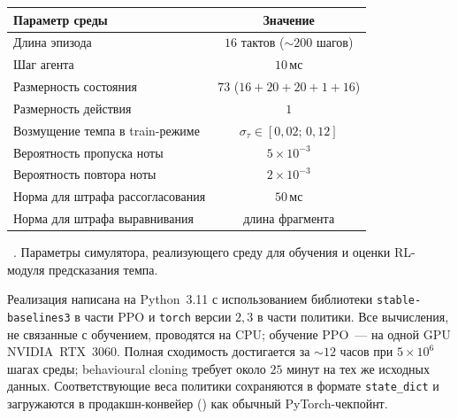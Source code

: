 \par\addvspace{2pt}
{\centering
{}%
\footnotesize
\begin{tabular}{@{}lc@{}}
  \toprule
  Параметр среды                           & Значение \\
  \midrule
  Длина эпизода                            & $16$ тактов ($\sim 200$ шагов) \\
  Шаг агента                               & $10$\,мс \\
  Размерность состояния                    & $73$ ($16+20+20+1+16$) \\
  Размерность действия                     & $1$ \\
  Возмущение темпа в train-режиме          & $\sigma_\tau\in[0{,}02;\,0{,}12]$ \\
  Вероятность пропуска ноты                & $5\!\times\!10^{-3}$ \\
  Вероятность повтора ноты                 & $2\!\times\!10^{-3}$ \\
  Норма для штрафа рассогласования         & $50$\,мс \\
  Норма для штрафа выравнивания            & длина фрагмента \\
  \bottomrule
\end{tabular}\par
\vspace{2pt}
\tablename~\thetable. Параметры симулятора, реализующего среду
для обучения и оценки RL-модуля предсказания темпа.\par}
\addvspace{4pt}

Реализация написана на Python~3.11 с использованием библиотеки
\texttt{stable-baselines3} в части PPO и \texttt{torch} версии $2{,}3$
в части политики. Все вычисления, не связанные с обучением, проводятся
на CPU; обучение PPO~--- на одной GPU NVIDIA~RTX~3060. Полная сходимость
достигается за $\sim 12$ часов при $5\!\times\!10^{6}$ шагах среды;
behavioural cloning требует около $25$ минут на тех же исходных
данных. Соответствующие веса политики сохраняются в формате
\texttt{state\_dict} и загружаются в продакшн-конвейер
() как обычный PyTorch-чекпойнт.
